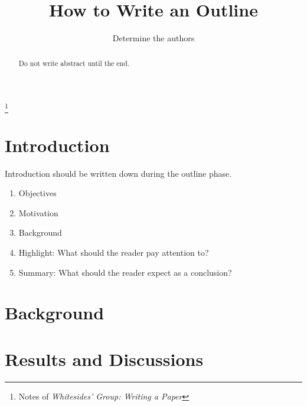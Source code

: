 \documentclass[%
 reprint,
 amsmath,amssymb,
 aps,
]{revtex4-1}
\begin{document}

\title{How to Write an Outline}%
\thanks{Notes of \em{Whitesides' Group: Writing a Paper} }%

\author{Determine the authors}



\begin{abstract}
Do not write abstract until the end.

\end{abstract}

\maketitle


\section{\label{introduction}Introduction}

Introduction should be written down during the outline phase.


\begin{enumerate}
    \item Objectives
    \item Motivation
    \item Background
    \item Highlight: What should the reader pay attention to?
    \item Summary: What should the reader expect as a conclusion?
\end{enumerate}


\section{\label{background}Background}

\section{\label{results}Results and Discussions}
\end{document}
